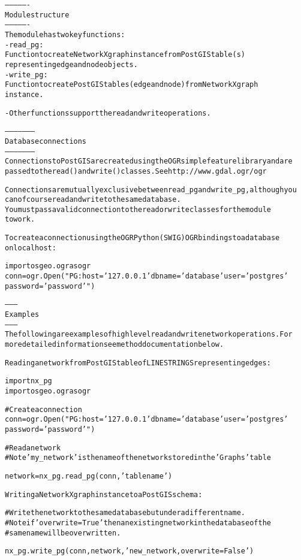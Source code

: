 \begin{alltt}
----------------
Module structure    
----------------
The module has two key functions:
    - read\_pg:
        Function to create NetworkX graph instance from PostGIS table(s) 
        representing edge and node objects.
    - write\_pg:
        Function to create PostGIS tables (edge and node) from NetworkX graph
        instance.
        
    - Other functions support the read and write operations.
    
--------------------
Database connections
--------------------
Connections to PostGIS are created using the OGR simple feature library and are
passed to the read() and write() classes. See http://www.gdal.ogr/ogr

Connections are mutually exclusive between read\_pg and write\_pg, although you 
can of course read and write to the same database. 
You must pass a valid connection to the read or write classes for the module 
to work.

To create a connection using the OGR Python (SWIG) OGR bindings to a database
on localhost:
    
    import osgeo.ogr as ogr
    conn = ogr.Open("PG: host='127.0.0.1' dbname='database' user='postgres'
                    password='password'")
    
--------
Examples
--------
The following are examples of high level read and write network operations. For
more detailed information see method documentation below.

Reading a network from PostGIS table of LINESTRINGS representing edges:
    
    import nx\_pg
    import osgeo.ogr as ogr
    
    \# Create a connection
    conn = ogr.Open("PG: host='127.0.0.1' dbname='database' user='postgres'
                    password='password'")

    \# Read a network
    \# Note 'my\_network' is the name of the network stored in the 'Graphs' table
    
    network = nx\_pg.read\_pg(conn, 'tablename')
    

Writing a NetworkX graph instance to a PostGIS schema:
    
    \# Write the network to the same database but under a different name.
    \# Note if 'overwrite=True' then an existing network in the database of the 
    \# same name will be overwritten.
    
    nx\_pg.write\_pg(conn, network, 'new\_network, overwrite=False')
    

\end{alltt}
